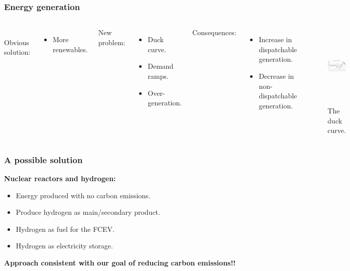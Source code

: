 \begin{frame}
\frametitle{Energy generation}
\begin{columns}
	\column[t]{4cm}
	\\
	Obvious solution:
	\begin{itemize}
		\item More renewables.
	\end{itemize}

    New problem:
	\begin{itemize}
		\item Duck curve.
		\item Demand ramps.
		\item Over-generation.
	\end{itemize}

    Consequences:
	\begin{itemize}
		\item Increase in dispatchable generation.
		\item Decrease in non-dispatchable generation.
	\end{itemize}

    \column[t]{6cm}
	\begin{figure}[htbp!]
		\begin{center}
			\includegraphics[height=4.0cm]{images/caiso-duck.png}
		\end{center}
		\caption{The duck curve.}
	\end{figure}
\end{columns}
\end{frame}


\begin{frame}
\frametitle{A possible solution}
    \textbf{Nuclear reactors and hydrogen:}
	\begin{itemize}
		\item Energy produced with no carbon emissions.
		\item Produce hydrogen as main/secondary product.
		\item Hydrogen as fuel for the FCEV.
		\item Hydrogen as electricity storage.
	\end{itemize}
	\centering
	\vspace{1cm}
	\textbf{Approach consistent with our goal of reducing carbon emissions!!}
\end{frame}


